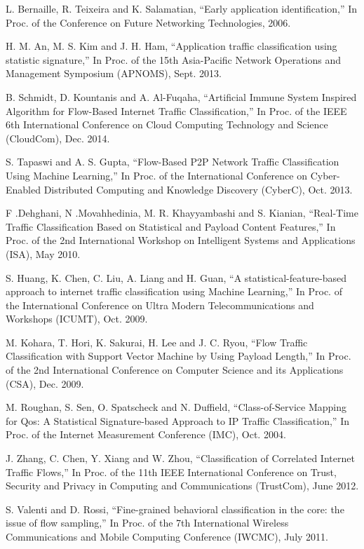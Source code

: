 \begin{thebibliography}{1}
L. Bernaille, R. Teixeira and K. Salamatian, 
``Early application identification,'' In Proc. of the Conference on Future Networking Technologies, 2006.

H. M. An, M. S. Kim and J. H. Ham,
``Application traffic classification using statistic signature,'' In Proc. of the 15th Asia-Pacific Network Operations and Management Symposium (APNOMS), Sept. 2013.

B. Schmidt, D. Kountanis and A. Al-Fuqaha, 
``Artificial Immune System Inspired Algorithm for Flow-Based Internet Traffic Classification,'' In Proc. of the IEEE 6th International Conference on Cloud Computing Technology and Science (CloudCom), Dec. 2014. 

S. Tapaswi and A. S. Gupta,
``Flow-Based P2P Network Traffic Classification Using Machine Learning,'' In Proc. of the International Conference on Cyber-Enabled Distributed Computing and Knowledge Discovery (CyberC), Oct. 2013. 

F .Dehghani, N .Movahhedinia, M. R. Khayyambashi and S. Kianian, 
``Real-Time Traffic Classification Based on Statistical and Payload Content Features,'' In Proc. of the 2nd International Workshop on Intelligent Systems and Applications (ISA), May 2010. 

S. Huang, K. Chen, C. Liu, A. Liang and H. Guan,
``A statistical-feature-based approach to internet traffic classification using Machine Learning,'' In Proc. of the International Conference on Ultra Modern Telecommunications and Workshops (ICUMT), Oct. 2009. 

M. Kohara, T. Hori, K. Sakurai, H. Lee and J. C. Ryou,
``Flow Traffic Classification with Support Vector Machine by Using Payload Length,'' In Proc. of the 2nd International Conference on Computer Science and its Applications (CSA), Dec. 2009.  

M. Roughan, S. Sen, O. Spatscheck and N. Duffield, 
``Class-of-Service Mapping for Qos: A Statistical Signature-based Approach to IP Traffic Classification,'' In Proc. of the Internet Measurement Conference (IMC), Oct. 2004.

J. Zhang, C. Chen, Y. Xiang and W. Zhou, 
``Classification of Correlated Internet Traffic Flows,'' In Proc. of the 11th IEEE International Conference on Trust, Security and Privacy in Computing and Communications (TrustCom), June 2012.

S. Valenti and D. Rossi, 
``Fine-grained behavioral classification in the core: the issue of flow sampling,'' In Proc. of the 7th International Wireless Communications and Mobile Computing Conference (IWCMC), July 2011.
 

\end{thebibliography}
